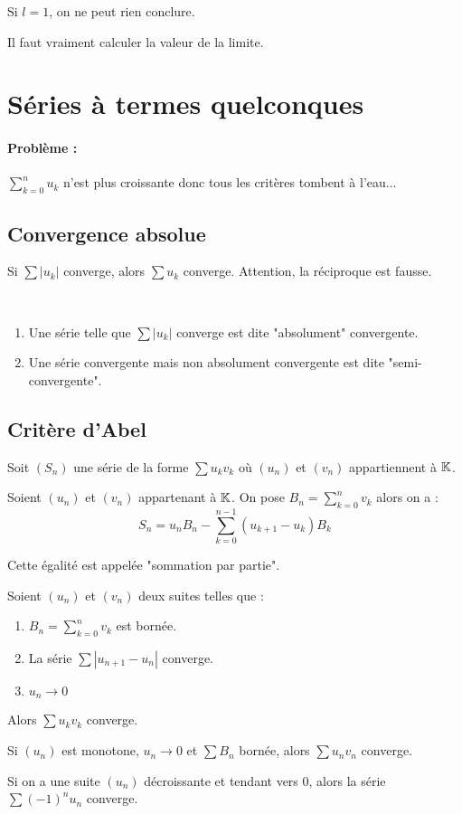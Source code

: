 \begin{rem}
Si $l=1$, on ne peut rien conclure.
\end{rem}
\begin{rem}
Il faut vraiment calculer la valeur de la limite.
\end{rem}
\section{Séries à termes quelconques}
\paragraph{Problème :} $\sum\limits_{k=0}^n u_k$ n'est plus croissante donc tous les critères tombent à l'eau...

\subsection{Convergence absolue}
\begin{thm}
Si $\sum|u_k|$ converge, alors $\sum u_k$ converge. Attention, la réciproque est fausse.
\end{thm}
\begin{defi}~
\begin{enumerate}
	\item Une série telle que $\sum |u_k|$ converge est dite "absolument" convergente.
	\item Une série convergente mais non absolument convergente est dite "semi-convergente". 
\end{enumerate}
\end{defi}

\subsection{Critère d'Abel}
Soit $(S_n)$ une série de la forme $\sum u_kv_k$ où $(u_n)$ et $(v_n)$ appartiennent à $\mathbb{K}$.

\begin{lem}
Soient $(u_n)$ et $(v_n)$ appartenant à $\mathbb{K}$. On pose $B_n=\sum\limits_{k=0}^nv_k$ alors on a :
$$S_n = u_nB_n-\sum\limits_{k=0}^{n-1}(u_{k+1}-u_k)B_k$$
\end{lem}
\begin{rem}
Cette égalité est appelée "sommation par partie".
\end{rem}

\begin{thm}
Soient $(u_n)$ et $(v_n)$ deux suites telles que :
\begin{enumerate}
	\item $B_n=\sum\limits_{k=0}^nv_k$ est bornée.
	\item La série $\sum|u_{n+1}-u_n|$ converge.
	\item $u_n\to0$
\end{enumerate}
Alors $\sum u_kv_k$ converge.
\end{thm}


\begin{rem}\end{rem}

\begin{coro}
Si $(u_n)$ est monotone, $u_n\to0$ et $\sum B_n$ bornée, alors $\sum u_nv_n$ converge.
\end{coro}
\begin{coro}
Si on a une suite $(u_n)$ décroissante et tendant vers 0, alors la série $\sum (-1)^nu_n$ converge.
\end{coro}
